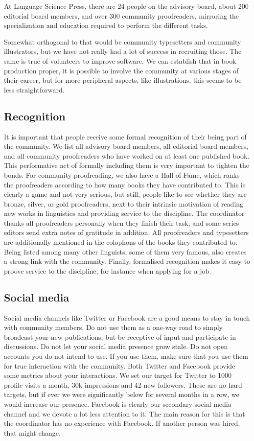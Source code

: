 \documentclass[nonflat,modfonts,output=book] {langsci/langscibook}
\begin{document}
At Language Science Press, there are 24 people on the advisory board, about 200 editorial board members, and over 300 community proofreaders, mirroring the specialization and education required to perform the different tasks. 

Somewhat orthogonal to that would be community typesetters and community illustrators, but we have not really had a lot of success in recruiting those. The same is true of volunteers to improve software. We can establish that in book production proper, it is possible to involve the community at various stages of their career, but for more peripheral aspects, like illustrations, this seems to be less straightforward. 

\subsection{Recognition}
It is important that people receive some formal recognition of their being part of the community. We list all advisory board members, all editorial board members, and all community proofreaders who have worked on at least one published book. This performative act of formally including them is very important to tighten the bonds. For community proofreading, we also have a Hall of Fame, which ranks the proofreaders according to how many books they have contributed to. This is clearly a game and not very serious, but still, people like to see whether they are bronze, silver, or gold proofreaders, next to their intrinsic motivation of reading new works in linguistics and providing service to the discipline. The coordinator thanks all proofreaders personally when they finish their task, and some series editors send extra notes of gratitude in addition. All proofreaders and typesetters are additionally mentioned in the colophons of the books they contributed to. Being listed among many other linguists, some of them very famous, also creates a strong link with the community. Finally, formalised recognition makes it easy to proove service to the discipline, for instance  when applying for a job.

\subsection{Social media}
Social media channels like Twitter or Facebook are a good means to stay in touch with community members. Do not use them as a one-way road to simply broadcast your new publications, but be receptive of input and participate in discussions. Do not let your social media presence grow stale. Do not open accounts you do not intend to use. If you use them, make sure that you use them for true interaction with the community. Both Twitter and Facebook provide some metrics about your interactions. We set our target for Twitter to 1000 profile visits a month, 30k impressions and 42 new followers. These are no hard targets, but if ever we were significantly below for several months in a row, we would increase our presence. 
Facebook is clearly our secondary social media channel and we devote a lot less attention to it. The main reason for this is that the coordinator has no experience with Facebook. If another person was hired, that might change. 
\end{document}
